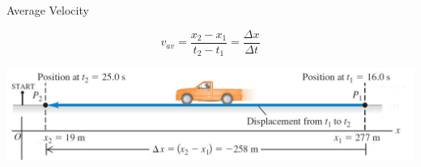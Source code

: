 \documentclass[]{beamer}
\begin{document}
\begin{frame}

Average Velocity
\vspace{3mm}

\begin{equation}
v_{av}=\frac{x_2-x_1}{t_2-t_1}=\frac{\Delta x}{\Delta t}
\end{equation}


  \begin{center}
  \includegraphics[height=1.in]{images/2.jpg}
\end{center}
 \end{frame}
    
\end{document}
